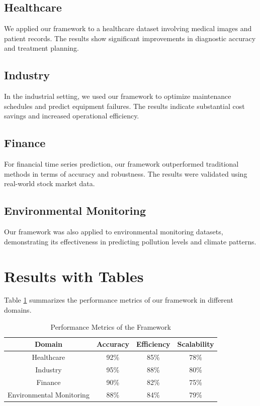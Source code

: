 \documentclass{article}
\begin{document}
\subsection{Healthcare}
We applied our framework to a healthcare dataset involving medical images and patient records. The results show significant improvements in diagnostic accuracy and treatment planning.

\subsection{Industry}
In the industrial setting, we used our framework to optimize maintenance schedules and predict equipment failures. The results indicate substantial cost savings and increased operational efficiency.

\subsection{Finance}
For financial time series prediction, our framework outperformed traditional methods in terms of accuracy and robustness. The results were validated using real-world stock market data.

\subsection{Environmental Monitoring}
Our framework was also applied to environmental monitoring datasets, demonstrating its effectiveness in predicting pollution levels and climate patterns.

\section{Results with Tables}
Table \ref{tab:results} summarizes the performance metrics of our framework in different domains.

\begin{table}[ht]
\centering
\begin{tabular}{|c|c|c|c|}
\hline
\textbf{Domain} & \textbf{Accuracy} & \textbf{Efficiency} & \textbf{Scalability} \\
\hline
Healthcare & 92\% & 85\% & 78\% \\
\hline
Industry & 95\% & 88\% & 80\% \\
\hline
Finance & 90\% & 82\% & 75\% \\
\hline
Environmental Monitoring & 88\% & 84\% & 79\% \\
\hline
\end{tabular}
\caption{Performance Metrics of the Framework}
\label{tab:results}
\end{table}
\end{document}
